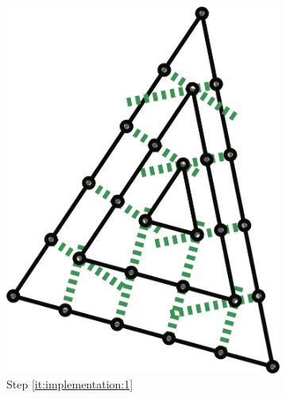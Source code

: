 \begin{figure}
\begin{subfigure}[b]{0.18\columnwidth}
		\includegraphics[width=\textwidth]{content/img/implementation/tessellation_1.png}
		\caption{Step \ref{it:implementation:1}}
		\label{fig:implementation:step:1}
	\end{subfigure}	
	\begin{subfigure}[b]{0.18\columnwidth}
		\centering

\end{subfigure}
\end{figure}
